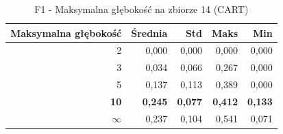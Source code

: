 \begin{table}[htbp]
\centering
\small
\setlength{\tabcolsep}{6pt}
\renewcommand{\arraystretch}{1.2}
\caption{F1 - Maksymalna głębokość na zbiorze 14 (CART)}
\label{tab:CART_max_depth_14_f1}
\begin{tabular}{r|r|r|r|r}
\toprule
Maksymalna głębokość & Średnia & Std & Maks & Min \\
\hline
2 & 0,000 & 0,000 & 0,000 & 0,000 \\
3 & 0,034 & 0,066 & 0,267 & 0,000 \\
5 & 0,137 & 0,113 & 0,389 & 0,000 \\
\textbf{10} & \textbf{0,245} & \textbf{0,077} & \textbf{0,412} & \textbf{0,133} \\
$\infty$ & 0,237 & 0,104 & 0,541 & 0,071 \\
\bottomrule
\end{tabular}
\end{table}